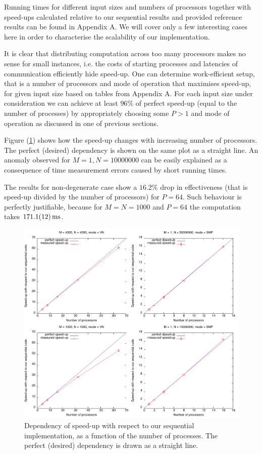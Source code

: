 Running times for different input sizes and numbers of processors together with speed-ups calculated relative to our sequential results and provided reference results can be found in Appendix A.
We will cover only a few interesting cases here in order to characterise the scalability of our implementation.

It is clear that distributing computation across too many processors makes no sense for small instances, i.e. the costs of starting processes and latencies of communication efficiently hide speed-up.
One can determine work-efficient setup, that is a number of processors and mode of operation that maximises speed-up, for given input size based on tables from Appendix A.
For each input size under consideration we can achieve at least $96 \%$ of perfect speed-up (equal to the number of processes) by appropriately choosing some $P > 1$ and mode of operation as discussed in one of previous sections.

Figure (\ref{plot:speedup-processes-1}) shows how the speed-up changes with increasing number of processors.
The perfect (desired) dependency is shown on the same plot as a straight line.
An anomaly observed for $M = 1, N = 10000000$ can be easily explained as a consequence of time measurement errors caused by short running times.

The results for non-degenerate case show a $16.2 \%$ drop in effectiveness (that is speed-up divided by the number of processors) for $P = 64$.
Such behaviour is perfectly justifiable, because for $M = N = 1000$ and $P = 64$ the computation takes $\SI{171.1 \pm 1.2}{\milli s}$.

\begin{figure}[h]
  \centering
  \includegraphics{./speedup-processes-1.pdf}
  \caption{Dependency of speed-up with respect to our sequential implementation, as a function of the number of processes. The perfect (desired) dependency is drawn as a straight line.}
  \label{plot:speedup-processes-1}
\end{figure}

